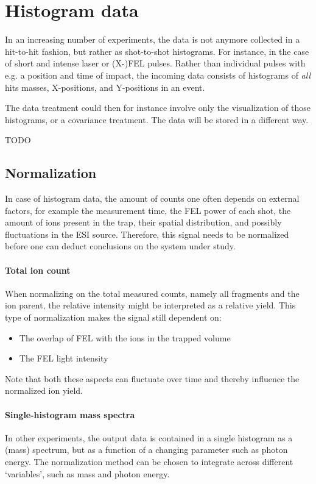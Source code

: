 \section{Histogram data}
In an increasing number of experiments, the data is not anymore collected in a hit-to-hit fashion, but rather as shot-to-shot histograms. For instance, in the case of short and intense laser or (X-)FEL pulses. Rather than individual pulses with e.g. a position and time of impact, the incoming data consists of histograms of \emph{all} hits masses, X-positions, and Y-positions in an event. 

The data treatment could then for instance involve only the visualization of those histograms, or a covariance treatment. The data will be stored in a different way.

TODO

\subsection{Normalization}

In case of histogram data, the amount of counts one often depends on external factors,  for example the measurement time, the FEL power of each shot, the amount of ions present in the trap, their spatial distribution, and possibly
fluctuations in the ESI source. Therefore, this signal needs to be normalized before one can deduct conclusions on the system under study. 

\paragraph {Total ion count} 
When normalizing on the total measured counts, namely all fragments and the ion
parent, the relative intensity might be interpreted as a relative yield. This type of normalization
makes the signal still dependent on:
\begin{itemize}
\item The overlap of FEL with the ions in the trapped volume
\item The FEL light intensity
\end{itemize}
Note that both these aspects can fluctuate over time and thereby influence the normalized ion yield.

\paragraph{Single-histogram mass spectra}
In other experiments, the output data is contained in a single histogram as a (mass) spectrum, but as a function of a changing parameter such as photon energy. The normalization method can be chosen to integrate across different `variables', such as mass and photon energy. 

